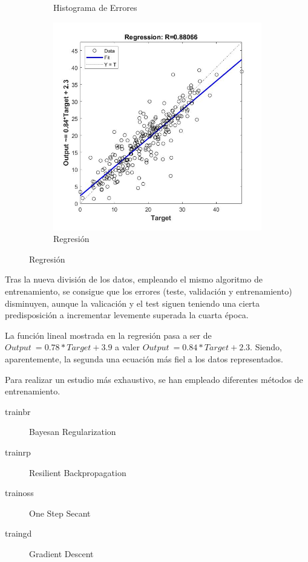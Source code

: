 \documentclass{article}
\begin{document}
\begin{figure}[H]
\begin{subfigure}{0.4\textwidth}
  \caption{Histograma de Errores}
 \end{subfigure}
 \begin{subfigure}{0.4\textwidth}
  \includegraphics[width=0.8\linewidth]{../images/I_ex3_regression_bodyfat_dataset_div60-20-20.jpg}
  \caption{Regresión}
 \end{subfigure}
\end{figure}

Tras la nueva división de los datos, empleando el mismo algoritmo de
entrenamiento, se consigue que los errores (teste, validación y entrenamiento)
disminuyen, aunque la valicación y el test siguen teniendo una cierta
predisposición a incrementar levemente superada la cuarta época. 

La función lineal mostrada en la regresión pasa a ser de $Output ~= 0.78*Target
+ 3.9$ a valer $Output ~= 0.84*Target + 2.3$. Siendo, aparentemente, la segunda
una ecuación más fiel a los datos representados.

Para realizar un estudio más exhaustivo, se han empleado diferentes métodos de
entrenamiento.

\begin{description}
\item [trainbr] Bayesan Regularization
\item [trainrp] Resilient Backpropagation
\item [trainoss] One Step Secant
\item [traingd] Gradient Descent
\end{description}
\end{document}
